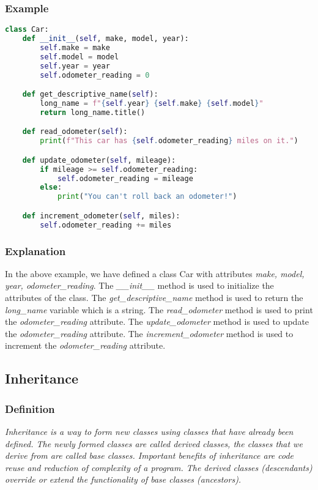 \documentclass[11pt]{article}
\begin{document}
\subsubsection{Example}

\begin{lstlisting}[language=Python]
class Car:
    def __init__(self, make, model, year):
        self.make = make
        self.model = model
        self.year = year
        self.odometer_reading = 0

    def get_descriptive_name(self):
        long_name = f"{self.year} {self.make} {self.model}"
        return long_name.title()

    def read_odometer(self):
        print(f"This car has {self.odometer_reading} miles on it.")

    def update_odometer(self, mileage):
        if mileage >= self.odometer_reading:
            self.odometer_reading = mileage
        else:
            print("You can't roll back an odometer!")

    def increment_odometer(self, miles):
        self.odometer_reading += miles
\end{lstlisting}

\subsubsection{Explanation}

In the above example, we have defined a class Car with attributes \textit{make, model, year, odometer\_reading}. The \textit{\_\_init\_\_} method is used to initialize the attributes of the class. The \textit{get\_descriptive\_name} method is used to return the \textit{long\_name} variable which is a string. The \textit{read\_odometer} method is used to print the \textit{odometer\_reading} attribute. The \textit{update\_odometer} method is used to update the \textit{odometer\_reading} attribute. The \textit{increment\_odometer} method is used to increment the \textit{odometer\_reading} attribute.

\subsection{Inheritance}

\subsubsection{Definition}

\textit{Inheritance is a way to form new classes using classes that have already been defined. The newly formed classes are called derived classes, the classes that we derive from are called base classes. Important benefits of inheritance are code reuse and reduction of complexity of a program. The derived classes (descendants) override or extend the functionality of base classes (ancestors).}
\end{document}
